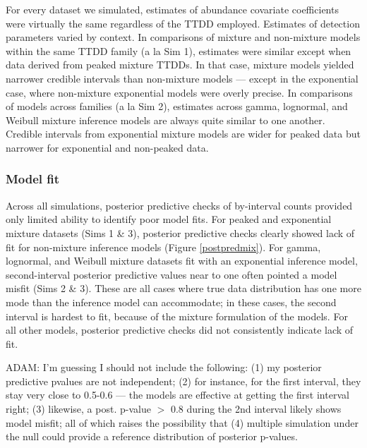 \documentclass[useAMS,usenatbib,referee,12pt]{article}
\newcommand{\adam}[1]{{\color{blue} ADAM: #1}}
\begin{document}
For every dataset we simulated, estimates of abundance covariate coefficients were virtually the same regardless of the TTDD employed.  Estimates of detection parameters varied by context.  In comparisons of mixture and non-mixture models within the same TTDD family (a la Sim 1), estimates were similar except when data derived from peaked mixture TTDDs.  In that case, mixture models yielded narrower credible intervals than non-mixture models --- except in the exponential case, where non-mixture exponential models were overly precise.  In comparisons of models across families (a la Sim 2), estimates across gamma, lognormal, and Weibull mixture inference models are always quite similar to one another.  Credible intervals from exponential mixture models are wider for peaked data but narrower for exponential and non-peaked data.  


\subsubsection{Model fit}\label{sec:modelfit}

Across all simulations, posterior predictive checks of by-interval counts provided only limited ability to identify poor model fits.  For peaked and exponential mixture datasets (Sims 1 \& 3), posterior predictive checks clearly showed lack of fit for non-mixture inference models (Figure \ref{postpredmix}).  For gamma, lognormal, and Weibull mixture datasets fit with an exponential inference model, second-interval posterior predictive values near to one often pointed a model misfit (Sims 2 \& 3).  These are all cases where true data distribution has one more mode than the inference model can accommodate; in these cases, the second interval is hardest to fit, because of the mixture formulation of the models.  For all other models, posterior predictive checks did not consistently indicate lack of fit.

\adam{I'm guessing I should not include the following: (1) my posterior predictive pvalues are not independent; (2) for instance, for the first interval, they stay very close to 0.5-0.6 --- the models are effective at getting the first interval right; (3) likewise, a post. p-value $>$ 0.8 during the 2nd interval likely shows model misfit; all of which raises the possibility that (4) multiple simulation under the null could provide a reference distribution of posterior p-values.}
\end{document}

